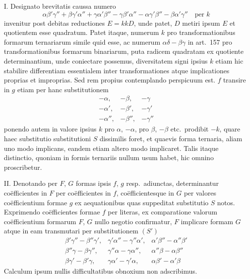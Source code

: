 I. Designato brevitatis caussa numero
\[
\alpha\beta'\gamma''+\beta\gamma'\alpha''+\gamma\alpha'\beta''
-\gamma\beta'\alpha''-\alpha\gamma'\beta''-\beta\alpha'\gamma''\quad\text{per }k
\]
invenitur post debitas reductiones $E=kkD$, unde patet, $D$ metiri ipsum $E$
et quotientem esse quadratum. Patet itaque, numerum $k$ pro transformationibus
formarum ternariarum simile quid esse, ac numerum $\alpha\delta-\beta\gamma$ in art.\ 157
pro transformationibus formarum binariarum, puta radicem quadratam ex quotiente
determinantium, unde coniectare possemus, diversitatem signi ipsius $k$
etiam hic stabilire differentiam essentialem inter transformationes atque implicationes
proprias et improprias. Sed rem propius contemplando perspicuum est. $f$
transire in $g$ etiam per hanc substitutionem
\[
\begin{array}{ccc}
-\alpha, & -\beta, & -\gamma \\
-\alpha', & -\beta', & -\gamma' \\
-\alpha'', & -\beta'', & -\gamma''
\end{array}
\]
ponendo autem in valore ipsius $k$ pro $\alpha$, $-\alpha$, pro $\beta$, $-\beta$ etc.\ prodibit $-k$,
quare haec substitutio substitutioni $S$ dissimilis foret, et quaevis forma ternaria,
aliam uno modo implicans, eandem etiam altero modo implicaret. Talis itaque
distinctio, quoniam in formis ternariis nullum usum habet, hic omnino proscribetur.

II. Denotando per $F$, $G$ formas ipsis $f$, $g$ resp.\ adiunctas, determinantur
co\"efficientes in $F$ per co\"efficientes in $f$, co\"efficientesque in $G$ per valores
co\"efficientium formae $g$ ex aequationibus quas suppeditat substitutio $S$ notos.
Exprimendo co\"efficientes formae $f$ per literas, ex comparatione valorum co\"efficientium
formarum $F$, $G$ nullo negotio confirmatur, $F$ implicare formam $G$ atque
in eam transmutari per substitutionem $(S')$
\[
\begin{array}{ccc}
\beta'\gamma''-\beta''\gamma', & \gamma'\alpha''-\gamma''\alpha', & \alpha'\beta''-\alpha''\beta' \\
\beta''\gamma-\beta\gamma'', & \gamma''\alpha-\gamma\alpha'', & \alpha''\beta-\alpha\beta'' \\
\beta\gamma'-\beta'\gamma, & \gamma\alpha'-\gamma'\alpha, & \alpha\beta'-\alpha'\beta
\end{array}
\]
Calculum ipsum nullis difficultatibus obnoxium non adscribimus.

